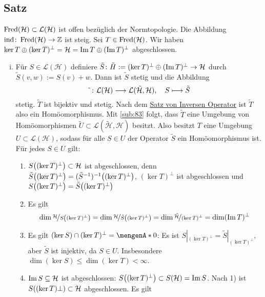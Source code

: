 \subsection{Satz} %
\label{sub:93}
$\Fred(\mathcal{H}) \subset \mathcal{L}(\mathcal{H})$ ist offen bezüglich der Normtopologie. Die Abbildung $\idx \colon \Fred(\mathcal{H}) \to \mathds{Z}$ ist steig.
Sei $T \in \Fred(\mathcal{H})$. Wir haben $\ker T \oplus (\ker T)^\bot = \mathcal{H} = \im T \oplus (\im T)^\bot$ abgeschlossen.
\begin{enumerate}[(i)]
	\item Für $S \in \mathcal{L}(\mathcal{H})$ definiere $\tilde{S} \colon \tilde{H} := (\ker T)^\bot \oplus (\im T)^\bot \to \mathcal{H}$ durch
	$\tilde{S}(v,w) := S(v)+w$. Dann ist $\tilde{S}$ stetig und die Abbildung 
	\[
		\tilde{\minwidthbox{ }{5pt}} \colon \mathcal{L}(\mathcal{H}) \longrightarrow \mathcal{L}(\tilde{\mathcal{H}}, \mathcal{H}) , \quad S \longmapsto \tilde{S}
	\]
	stetig. $\tilde{T}$ ist bijektiv und stetig. Nach dem \hyperref[sub:39]{Satz von Inversen Operator} ist $\tilde{T}$ also ein Homöomorphismus. Mit \ref{sub:83} folgt,
	dass $\tilde{T}$ eine Umgebung von Homöomorphismen $\tilde{U}\subset\mathcal{L}(\tilde{\mathcal{H}},\mathcal{H})$ besitzt. Also besitzt $T$ eine Umgebung 
	$U \subset \mathcal{L}(\mathcal{H})$, sodass für alle $S \in U$ der Operator $\tilde{S}$ ein Homöomorphismus ist. Für jedes $S \in U$ gilt:
	\begin{enumerate}[1)]
		\item $S\enbrace*{(\ker T)^\bot} \subset \mathcal{H}$ ist abgeschlossen, denn $\tilde{S}\enbrace*{(\ker T)^\bot}= (\tilde{S}^{-1})^{-1}\enbrace*{(\ker T)^\bot}$, 
		$(\ker T)^\bot$ ist abgeschlossen und $S\enbrace*{(\ker T)^\bot} = \tilde{S} \enbrace*{(\ker T)^\bot}$
		\item Es gilt
		\[
			\dim \nicefrac{\mathcal{H}}{S\enbrace*{(\ker T)^\bot}} = \dim \nicefrac{\mathcal{H}}{\tilde{S}\enbrace*{(\ker T)^\bot}} = \dim  
			\nicefrac{\tilde{\mathcal{H}}}{(\ker T)^\bot} = \dim (\im T)^\bot
		\]
		\item Es gilt $(\ker S) \cap (\ker T)^\bot = \set{0}$: Es ist $S|_{(\ker T)^\bot} = \tilde{S}|_{(\ker T)^\bot}$, aber $\tilde{S}$ ist injektiv, da $S \in U$. 
		Insbesondere $\dim (\ker S) \le \dim (\ker T) < \infty$.
		\item $\im S \subseteq \mathcal{H}$ ist abgeschlossen: $S \enbrace*{(\ker T)^\bot} \subset S(\mathcal{H})=\im S$. Nach 1) ist 
		$S \enbrace*{(\ker T)\bot} \subset \mathcal{H}$ abgeschlossen. Es gilt

\end{enumerate}
\end{enumerate}
